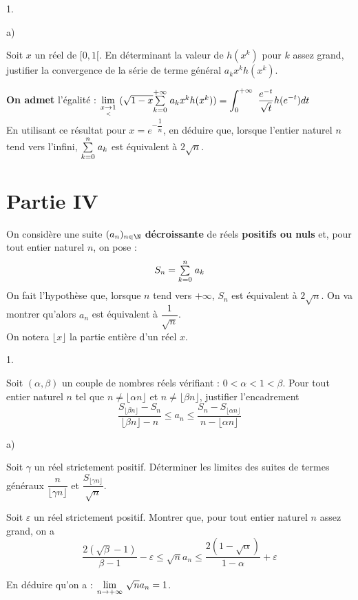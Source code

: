 \documentclass[11pt]{article}%
\begin{document}
\begin{noliste}{1.}
\begin{noliste}{a)}
\item Soit $x$ un réel de $[0,1[$. En déterminant la valeur de
$h(x^{k})$
pour $k$ assez grand, justifier la convergence de la série de terme
général $a_{k}x^{k}h(x^{k})$.
\end{noliste}

\item \textbf{On admet} l'égalité : ${\displaystyle \lim_{x\underset{<}{\rightarrow
}1} \ }(\sqrt{1-x}{\textstyle\sum\limits_{k = 0}^{+ \infty
}}\hspace{.1cm}a_{k}x^{k}h(x^{k})) = \displaystyle \int_{0}^{+ \infty
}\ \dfrac{e^{-t}}{\sqrt{t}}h(e^{-t})dt$\\
En utilisant ce résultat pour $x = e^{-\dfrac{1}{n}}$, en déduire que,
lorsque
l'entier naturel $n$ tend vers l'infini, ${\textstyle\sum\limits_{k = 0}^{n}}\hspace{.1cm}a_{k}$ est
équivalent à $2\sqrt{n}$.
\end{noliste}

\section*{Partie IV}

On considère une suite $(a_{n})_{n\in \N}$ \textbf{décroissante} de
réels \textbf{positifs ou nuls} et, pour tout entier naturel $n$, on
pose : 
\[
S_{n} = {\textstyle\sum\limits_{k = 0}^{n}}\hspace{.1cm}a_{k}
\]
On fait l'hypothèse que, lorsque $n$ tend vers $ + \infty $, $S_{n}$
est équivalent à $2\sqrt{n}$. On va montrer qu'alors $a_{n}$ est
équivalent à $\dfrac{1}{\sqrt{n}}$.\\
On notera $\lfloor x\rfloor $ la partie entière d'un réel $x$.

\begin{noliste}{1.}
 \setlength{\itemsep}{4mm}
\item Soit $(\alpha,\beta )$ un couple de nombres réels vérifiant :
$0<\alpha <1<\beta $. Pour tout entier naturel $n$ tel que $n\not =
\lfloor
\alpha n\rfloor $ et $n\not = \lfloor \beta n\rfloor $, justifier
l'encadrement 
\[
\dfrac{S_{\lfloor \beta n\rfloor }-S_{n}}{\lfloor \beta n\rfloor
-n}\leq a_{n}\leq \dfrac{S_{n}-S_{\lfloor \alpha n\rfloor }}{n-\lfloor
\alpha n\rfloor }
\]

\item 

\begin{noliste}{a)}
 \setlength{\itemsep}{2mm}
\item Soit $\gamma $ un réel strictement positif. Déterminer les
limites des
suites de termes généraux $\dfrac{n}{\lfloor \gamma n\rfloor }$ et
$\dfrac{S_{\lfloor \gamma n\rfloor }}{\sqrt{n}}$.

\item Soit $\varepsilon $ un réel strictement positif. Montrer que,
pour
tout entier naturel $n$ assez grand, on a 
\[
\dfrac{2(\sqrt{\beta }-1)}{\beta -1}-\varepsilon \leq \sqrt{n}a_{n}\leq
\dfrac{2(1-\sqrt{\alpha })}{1-\alpha } + \varepsilon
\]
\end{noliste}

\item En déduire qu'on a : ${\displaystyle \lim_{n\rightarrow + \infty } \ }\sqrt{n}a_{n}
= 1 $.
\end{noliste}
\end{document}
